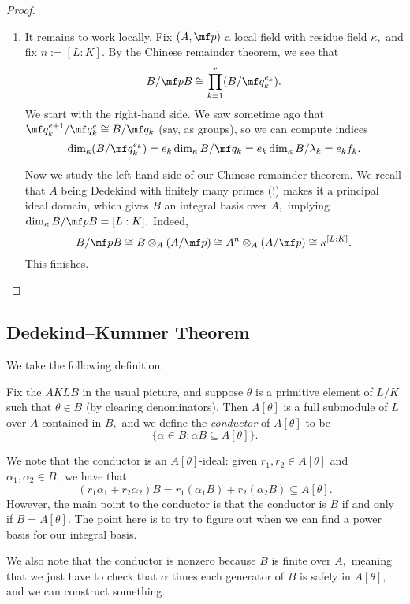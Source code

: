 \documentclass[../notes.tex]{subfiles}
\begin{document}
\begin{proof}
\begin{enumerate}
		\item It remains to work locally. Fix $(A,\mf p)$ a local field with residue field $\kappa,$ and fix $n:=[L:K].$ By the Chinese remainder theorem, we see that
		\[B/\mf pB\cong\prod_{k=1}^r(B/\mf q_k^{e_k}).\]
		We start with the right-hand side. We saw sometime ago that $\mf q_k^{e+1}/\mf q_k^e\cong B/\mf q_k$ (say, as groups), so we can compute indices
		\[\dim_\kappa(B/\mf q_k^{e_k})=e_k\dim_\kappa B/\mf q_k=e_k\dim_\kappa B/\lambda_k=e_kf_k.\]

		Now we study the left-hand side of our Chinese remainder theorem. We recall that $A$ being Dedekind with finitely many primes (!) makes it a principal ideal domain, which gives $B$ an integral basis over $A,$ implying $\dim_\kappa B/\mf pB=[L:K].$ Indeed,
		\[B/\mf pB\cong B\otimes_A(A/\mf p)\cong A^n\otimes_A(A/\mf p)\cong\kappa^{[L:K]}.\]
		This finishes.
		\qedhere
	\end{enumerate}
\end{proof}

\subsection{Dedekind--Kummer Theorem}
We take the following definition.
\begin{defi}[Conductor]
	Fix the $AKLB$ in the usual picture, and suppose $\theta$ is a primitive element of $L/K$ such that $\theta\in B$ (by clearing denominators). Then $A[\theta]$ is a full submodule of $L$ over $A$ contained in $B,$ and we define the \textit{conductor} of $A[\theta]$ to be
	\[\{\alpha\in B:\alpha B\subseteq A[\theta]\}.\]
\end{defi}
We note that the conductor is an $A[\theta]$-ideal: given $r_1,r_2\in A[\theta]$ and $\alpha_1,\alpha_2\in B,$ we have that
\[(r_1\alpha_1+r_2\alpha_2)B=r_1(\alpha_1B)+r_2(\alpha_2B)\subseteq A[\theta].\]
However, the main point to the conductor is that the conductor is $B$ if and only if $B=A[\theta].$ The point here is to try to figure out when we can find a power basis for our integral basis.

We also note that the conductor is nonzero because $B$ is finite over $A,$ meaning that we just have to check that $\alpha$ times each generator of $B$ is safely in $A[\theta],$ and we can construct something.
\end{document}
